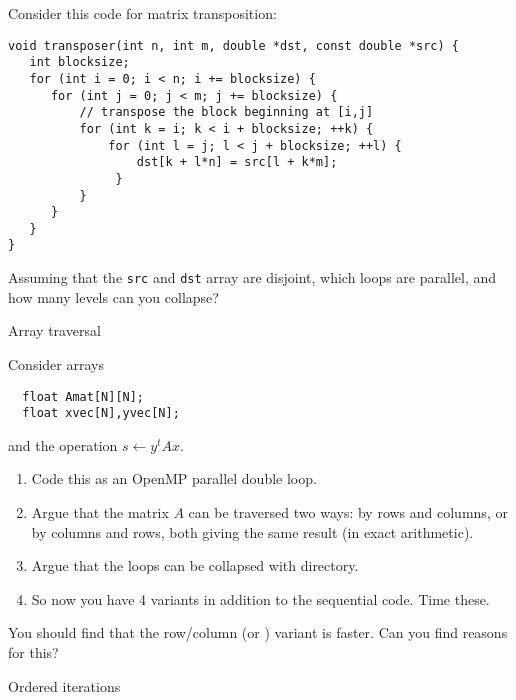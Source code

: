 \begin{exercise}
  Consider this code for matrix transposition:
\begin{lstlisting}
void transposer(int n, int m, double *dst, const double *src) {
   int blocksize;
   for (int i = 0; i < n; i += blocksize) {
      for (int j = 0; j < m; j += blocksize) {
          // transpose the block beginning at [i,j]
          for (int k = i; k < i + blocksize; ++k) {
              for (int l = j; l < j + blocksize; ++l) {
                  dst[k + l*n] = src[l + k*m];
               }
          }
      }
   }
}  
\end{lstlisting}
Assuming that the \lstinline{src} and \lstinline{dst}
array are disjoint, which loops are parallel, and how many
levels can you collapse?
\end{exercise}

 {Array traversal}
\label{sec:omp-row-col-major}

Consider arrays 
\begin{lstlisting}
  float Amat[N][N];
  float xvec[N],yvec[N];  
\end{lstlisting}
and the operation $s\leftarrow y^tAx$.

\begin{enumerate}
\item Code this as an OpenMP parallel double loop.
\item Argue that the matrix $A$ can be traversed two ways:
  by rows and columns, or by columns and rows, both
  giving the same result (in exact arithmetic).
\item Argue that the loops can be collapsed with 
  directory.
\item So now you have 4 variants in addition to the sequential code.
  Time these.
\end{enumerate}

You should find that the row/column (or ) variant
is faster. Can you find reasons for this?



 {Ordered iterations}
\label{sec:omp-ordered}

